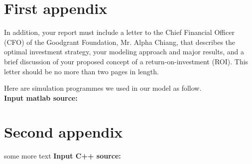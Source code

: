 \documentclass{mcmthesis}
\begin{document}
\begin{appendices}

\section{First appendix}

In addition, your report must include a letter to the Chief Financial Officer (CFO) of the Goodgrant Foundation, Mr. Alpha Chiang, that describes the optimal investment strategy, your modeling approach and major results, and a brief discussion of your proposed concept of a return-on-investment (ROI). This letter should be no more than two pages in length.

Here are simulation programmes we used in our model as follow.\\

\textbf{\textcolor[rgb]{0.98,0.00,0.00}{Input matlab source:}}


\section{Second appendix}

some more text \textcolor[rgb]{0.98,0.00,0.00}{\textbf{Input C++ source:}}


\end{appendices}
\end{document}
